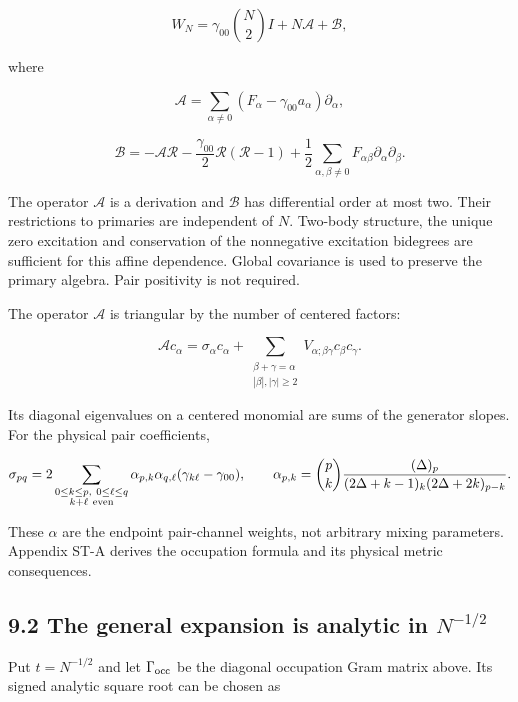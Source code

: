 \documentclass[a4paper,11pt]{article}
\numberwithin{equation}{section}
\begin{document}
\[
W_N=\gamma_{00}\binom N2 I+N\mathscr A+\mathscr B,
\]

where

\[
\mathscr A=\sum_{\alpha\ne0}(F_\alpha-\gamma_{00}a_\alpha)\partial_\alpha,
\]

\[
\mathscr B=-\mathscr A\mathcal R
-\frac{\gamma_{00}}2\mathcal R(\mathcal R-1)
+\frac12\sum_{\alpha,\beta\ne0}F_{\alpha\beta}\partial_\alpha\partial_\beta.
\]

The operator \(\mathscr A\) is a derivation and \(\mathscr B\) has differential order at most two. Their restrictions to primaries are independent of \(N\). Two-body structure, the unique zero excitation and conservation of the nonnegative excitation bidegrees are sufficient for this affine dependence. Global covariance is used to preserve the primary algebra. Pair positivity is not required.

The operator \(\mathscr A\) is triangular by the number of centered factors:

\[
\mathscr Ac_\alpha=\sigma_\alpha c_\alpha+
\sum_{\substack{\beta+\gamma=\alpha\\|\beta|,|\gamma|\geq2}}
V_{\alpha;\beta\gamma}c_\beta c_\gamma.
\]

Its diagonal eigenvalues on a centered monomial are sums of the generator slopes. For the physical pair coefficients,

\[
\sigma_{pq}=2\sum_{\substack{0\leq k\leq p,\ 0\leq\ell\leq q\\ k+\ell\ {\rm even}}}
\alpha_{p,k}\alpha_{q,\ell}(\gamma_{k\ell}-\gamma_{00}),
\qquad
\alpha_{p,k}=
\binom pk\frac{(\Delta)_p}
{(2\Delta+k-1)_k(2\Delta+2k)_{p-k}}.
\]

These \(\alpha\) are the endpoint pair-channel weights, not arbitrary mixing parameters. Appendix ST-A derives the occupation formula and its physical metric consequences.

\hypertarget{the-general-expansion-is-analytic-in-n-12}{%
\subsection{\texorpdfstring{9.2 The general expansion is analytic in \(N^{-1/2}\)}{9.2 The general expansion is analytic in N\^{}\{-1/2\}}}\label{the-general-expansion-is-analytic-in-n-12}}

Put \(t=N^{-1/2}\) and let \(\Gamma_{\rm occ}\) be the diagonal occupation Gram matrix above. Its signed analytic square root can be chosen as
\end{document}
